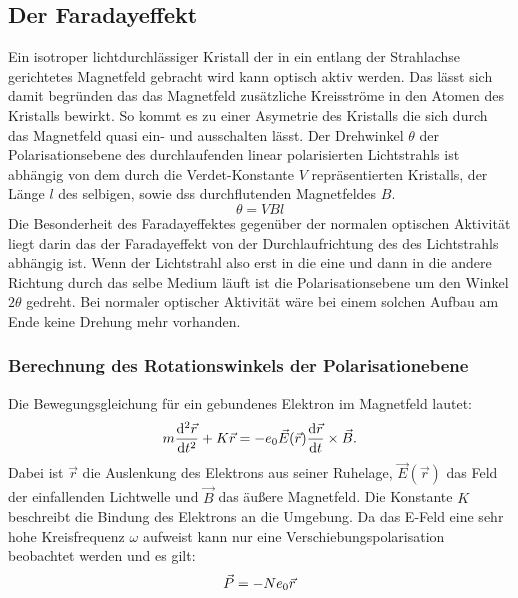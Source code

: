 \subsection{Der Faradayeffekt}
\label{sec:faradayeffekt}
Ein isotroper lichtdurchlässiger Kristall der in ein entlang der Strahlachse gerichtetes Magnetfeld gebracht wird 
kann optisch aktiv werden. Das lässt sich damit begründen das das Magnetfeld zusätzliche Kreisströme in den Atomen 
des Kristalls bewirkt. So kommt es zu einer Asymetrie des Kristalls die sich durch das Magnetfeld quasi ein- und ausschalten
lässt. Der Drehwinkel $\theta$ der Polarisationsebene des durchlaufenden linear polarisierten Lichtstrahls ist abhängig
von dem durch die Verdet-Konstante $V$ repräsentierten Kristalls, der Länge $l$ des selbigen, sowie dss durchflutenden
Magnetfeldes $B$.
\begin{equation*}
  \theta=VBl
\end{equation*}
Die Besonderheit des Faradayeffektes gegenüber der normalen optischen Aktivität liegt darin das der Faradayeffekt von der 
Durchlaufrichtung des des Lichtstrahls abhängig ist. Wenn der Lichtstrahl also erst in die eine und dann in die andere Richtung 
durch das selbe Medium läuft ist die Polarisationsebene um den Winkel $2\theta$ gedreht. Bei normaler optischer Aktivität 
wäre bei einem solchen Aufbau am Ende keine Drehung mehr vorhanden.
\subsubsection{Berechnung des Rotationswinkels der Polarisationebene}
\label{sec:rotationsweinkel}
Die Bewegungsgleichung für ein gebundenes Elektron im Magnetfeld lautet:
\begin{equation*}
  m\frac{\mathrm{d}^2 \vec{r}}{\mathrm{d}t^2}+K\vec{r}=-e_0\vec{E}(\vec{r})\frac{\mathrm{d} \vec{r}}{\mathrm{d}t}\times \vec{B}.\\
\end{equation*}
Dabei ist $\vec{r}$ die Auslenkung des Elektrons aus seiner Ruhelage, $\vec{E}(\vec{r})$ das Feld der einfallenden Lichtwelle
und $\vec{B}$ das äußere Magnetfeld. Die Konstante $K$ beschreibt die Bindung des Elektrons an die Umgebung. Da das E-Feld eine
sehr hohe Kreisfrequenz $\omega$ aufweist kann nur eine Verschiebungspolarisation beobachtet werden und es gilt:
\begin{equation*}
  \vec{P}=-Ne_0 \vec{r}\\
\end{equation*} 

